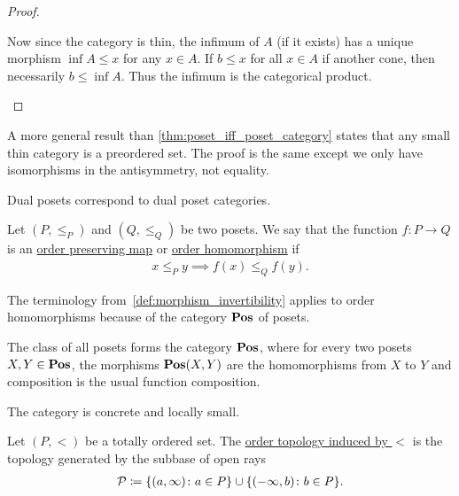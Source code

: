 \begin{proof}
\begin{description}
    Now since the category is thin, the infimum of $A$ (if it exists) has a unique morphism $\inf A \leq x$ for any $x \in A$. If $b \leq x$ for all $x \in A$ if another cone, then necessarily $b \leq \inf A$. Thus the infimum is the categorical product.
  \end{description}
\end{proof}

\begin{note}\label{note:small_thin_category_isomorphic_to_preorder}
  A more general result than \cref{thm:poset_iff_poset_category} states that any small thin category is a preordered set. The proof is the same except we only have isomorphisms in the antisymmetry, not equality.
\end{note}

\begin{proposition}\label{thm:dual_poset_dual_poset_category}
  Dual posets correspond to dual poset categories.
\end{proposition}

\begin{definition}\label{def:order_homomorphism}
  Let $(P, \leq_P)$ and $(Q, \leq_Q)$ be two posets. We say that the function $f: P \to Q$ is an \ul{order preserving map} or \ul{order homomorphism} if
  \begin{align*}
    x \leq_P y \implies f(x) \leq_Q f(y).
  \end{align*}

  The terminology from~\cref{def:morphism_invertibility} applies to order homomorphisms because of the category $\operatorname{\mathbf{Pos}}$ of posets.
\end{definition}

\begin{definition}\label{def:category_of_posets}
  The class of all posets forms the category $\operatorname{\mathbf{Pos}}$, where for every two posets $X, Y \in \operatorname{\mathbf{Pos}}$, the morphisms $\operatorname{\mathbf{Pos}}(X, Y)$ are the homomorphisms from $X$ to $Y$ and composition is the usual function composition.

  The category is concrete and locally small.
\end{definition}

\begin{definition}\label{def:order_topology}\cite{nLab:order_topology}
  Let $(P, <)$ be a totally ordered set. The \ul{order topology induced by $<$} is the topology generated by the subbase of open rays
  \begin{align*}
    \mathcal P \coloneqq \{ (a, \infty) \colon a \in P \} \cup \{ (-\infty, b) \colon b \in P \}.
  \end{align*}
\end{definition}
